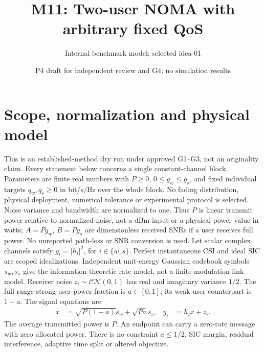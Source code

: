 \documentclass[11pt]{article}
\title{M11: Two-user NOMA with arbitrary fixed QoS}
\author{Internal benchmark model; selected idea-01}
\date{P4 draft for independent review and G4; no simulation results}
\begin{document}
\maketitle

\section{Scope, normalization and physical model}
This is an established-method dry run under approved G1--G3, not an
originality claim. Every statement below concerns a single constant-channel
block. Parameters are finite real numbers with
\(P\geq0\), \(0\leq g_w\leq g_s\), and fixed individual targets
\(q_w,q_s\geq0\) in bit/s/Hz over the whole block. No fading distribution,
physical deployment, numerical tolerance or experimental protocol is selected.
Noise variance and bandwidth are normalized to one. Thus \(P\) is linear
transmit power relative to normalized noise, not a dBm input or a physical
power value in watts; \(A=Pg_w\), \(B=Pg_s\) are dimensionless received
SNRs if a user receives full power. No unreported path-loss or SNR conversion
is used. Let scalar complex channels satisfy \(g_i=|h_i|^2\), for
\(i\in\{w,s\}\). Perfect instantaneous CSI and ideal SIC are scoped
idealizations. Independent unit-energy Gaussian codebook symbols \(s_w,s_s\)
give the information-theoretic rate model, not a finite-modulation link model.
Receiver noise \(z_i\sim\mathcal{CN}(0,1)\) has real and imaginary
variance \(1/2\). The full-range strong-user power fraction is
\(a\in[0,1]\); its weak-user counterpart is \(1-a\). The signal equations are
\begin{align}
 x&=\sqrt{P(1-a)}s_w+\sqrt{Pa}s_s, & y_i&=h_ix+z_i.
\end{align}
The average transmitted power is \(P\). An endpoint can carry a zero-rate
message with zero allocated power. There is no constraint \(a\leq1/2\),
SIC margin, residual interference, adaptive time split or altered objective.
\end{document}
